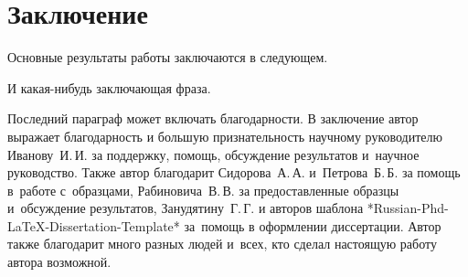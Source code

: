\chapter*{Заключение}                       %



Основные результаты работы заключаются в следующем.

И какая-нибудь заключающая фраза.

Последний параграф может включать благодарности.  В заключение автор
выражает благодарность и большую признательность научному руководителю
Иванову~И.\,И. за поддержку, помощь, обсуждение результатов и~научное
руководство. Также автор благодарит Сидорова~А.\,А. и~Петрова~Б.\,Б.
за помощь в~работе с~образцами, Рабиновича~В.\,В. за предоставленные
образцы и~обсуждение результатов, Занудятину~Г.\,Г. и авторов шаблона
*Russian-Phd-LaTeX-Dissertation-Template* за~помощь в оформлении
диссертации. Автор также благодарит много разных людей
и~всех, кто сделал настоящую работу автора возможной.

